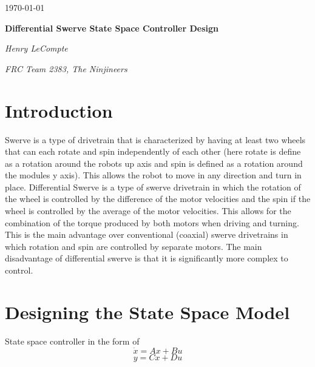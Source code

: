 \documentclass{scrartcl}
\begin{document}
\begin{titlepage}
    \centering
    {\large \today\par}
    \vfill

    {\huge\bfseries Differential Swerve State Space Controller Design\par}
    \vfill

    {\Large\itshape Henry LeCompte}\par
    {\itshape FRC Team 2383, The Ninjineers}\par
    \vspace{1.5cm}

    \vfill
\end{titlepage}

\newpage

\doublespacing
\tableofcontents
\singlespacing

\newpage

\doublespacing

\section{Introduction}
Swerve is a type of drivetrain that is characterized by having at least two wheels that can each rotate and spin independently of each other (here rotate is define as a rotation around the robots up axis and spin is defined as a rotation around the modules y axis). This allows the robot to move in any direction and turn in place. Differential Swerve is a type of swerve drivetrain in which the rotation of the wheel is controlled by the difference of the motor velocities and the spin if the wheel is controlled by the average of the motor velocities. This allows for the combination of the torque produced by both motors when driving and turning. This is the main advantage over conventional (coaxial) swerve drivetrains in which rotation and spin are controlled by separate motors. The main disadvantage of differential swerve is that it is significantly more complex to control.

\section{Designing the State Space Model}

State space controller in the form of
\begin{equation} \label{state-change}
    \dot{x} = Ax + Bu
\end{equation}
\begin{equation} \label{output}
    y = Cx + Du
\end{equation}
\end{document}
